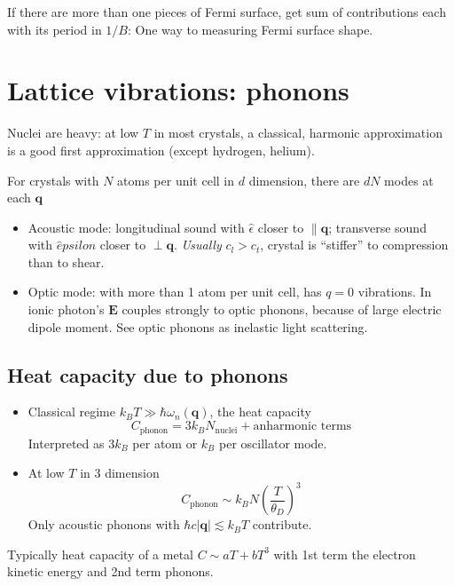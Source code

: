 \documentclass[11pt,letterpaper]{article}
\numberwithin{equation}{section} %
\renewcommand*{\vec}[1]{\bm{#1}}
\begin{document}
If there are more than one pieces of Fermi surface, get sum of contributions
each with its period in $1/B$: One way to measuring Fermi surface shape. 

\section{Lattice vibrations: phonons}
\label{sec:lattice_vibrations_phonons}
Nuclei are heavy: at low $T$ in most crystals, a classical, harmonic
approximation is a good first approximation (except hydrogen, helium).

For crystals with $N$ atoms per unit cell in $d$ dimension, there are $dN$
modes at each $\vec q$
\begin{itemize}
  \item Acoustic mode: longitudinal sound with $\hat \epsilon$ closer to
	  $\parallel \vec q$; transverse sound with $\hat epsilon$ closer to
	  $\perp \vec q$. \emph{Usually} $c_l > c_t$, crystal is ``stiffer'' to
	  compression than to shear. 
  \item Optic mode: with more than 1 atom per unit cell, has $q=0$
	  vibrations. In ionic photon's $\vec E$ couples strongly to optic
	  phonons, because of large electric dipole moment. See optic phonons as
	  inelastic light scattering. 
\end{itemize}

\subsection{Heat capacity due to phonons}
\label{sub:heat_capacity_due_to_phonons}
\begin{itemize}
	\item Classical regime $k_BT \gg \hbar \omega_n(\vec q)$, the heat capacity
	\begin{equation}
		C_{\mbox{phonon}} = 3k_B N_{\mbox{nuclei}} + \mbox{anharmonic terms}
	\end{equation}
	Interpreted as $3k_B$ per atom or $k_B$ per oscillator mode. 
	\item At low $T$ in 3 dimension
		\begin{equation}
			C_{\mbox{phonon}} \sim k_B N \left(\frac T{\theta_D}\right)^3
		\end{equation}
		Only acoustic phonons with $\hbar c|\vec q|\lesssim k_BT$
		contribute. 
\end{itemize}
Typically heat capacity of a metal $C\sim aT + bT^3$ with 1st term the
electron kinetic energy and 2nd term phonons.
\end{document}

